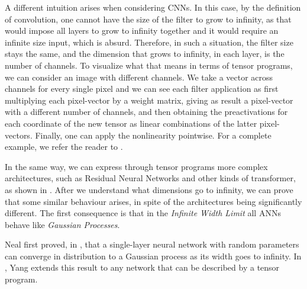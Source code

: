 \documentclass[11pt,notitlepage]{article}
\numberwithin{equation}{section}
\theoremstyle{remark}
\theoremstyle{definition}
\begin{document}
	A different intuition arises when considering CNNs.
	In this case, by the definition of convolution, one cannot have the size of the filter to grow to infinity, as that would impose all layers to grow to infinity together and it would require an infinite size input, which is absurd.
	Therefore, in such a situation, the filter size stays the same, and the dimension that grows to infinity, in each layer, is the number of channels.
	To visualize what that means in terms of tensor programs, we can consider an image with different channels.
	We take a vector across channels for every single pixel and we can see each filter application as first multiplying each pixel-vector by a weight matrix, giving as result a pixel-vector with a different number of channels, and then obtaining the preactivations for each coordinate of the new tensor as linear combinations of the latter pixel-vectors.
	Finally, one can apply the nonlinearity pointwise.
	For a complete example, we refer the reader to \cite[Appendix B.6]{yang2019scaling}.
	
	In the same way, we can express through tensor programs more complex architectures, such as Residual Neural Networks and other kinds of transformer, as shown in \cite[Appendix B]{yang2019scaling}.
	After we understand what dimensions go to infinity, we can prove that some similar behaviour arises, in spite of the architectures being significantly different.
	The first consequence is that in the \emph{Infinite Width Limit} all ANNs behave like \emph{Gaussian Processes}.
	
	Neal first proved, in \cite{neal2012bayesian}, that a single-layer neural network with random parameters can converge in distribution to a Gaussian process as its width goes to infinity. In \cite{yang2019scaling}, Yang extends this result to any network that can be described by a tensor program.
	
\end{document}
